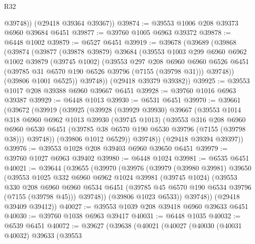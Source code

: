 \begin{lexlean}{R32}
\begin{coremodule}
          @39748))
      (@29418 @39364 @39367))
@39874 := @39553 @1006 @208 @39373 @6960 @39684 @6451
@39877 := @39760 @1005 @6963 @39372
@39878 := @6448 @1002
@39879 := @6527 @6451
@39919 := @39678
    (@39689
      (@39868
        (@39874
          (@39877
            (@39878 @39879)
            @39684
            (@39553
              @1003
              @299
              @6960
              @6962
              @1002
              @39879
              (@39745 @1002)
              (@39553
                @297
                @208
                @6960
                @6960
                @6526
                @6451
                (@39785 @31 @6570 @190 @6526 @39796 (@7155 (@39798 @31)))
                @39748))
            (@39806 @1001 @6525))
          @39748))
      (@29418 @39379 @39382))
@39925 := @39553 @1017 @208 @39388 @6960 @39667 @6451
@39928 := @39760 @1016 @6963 @39387
@39929 := @6448 @1013
@39930 := @6531 @6451
@39970 := @39661
    (@39672
      (@39919
        (@39925
          (@39928
            (@39929 @39930)
            @39667
            (@39553
              @1014
              @318
              @6960
              @6962
              @1013
              @39930
              (@39745 @1013)
              (@39553
                @316
                @208
                @6960
                @6960
                @6530
                @6451
                (@39785 @38 @6570 @190 @6530 @39796 (@7155 (@39798 @38)))
                @39748))
            (@39806 @1012 @6529))
          @39748))
      (@29418 @39394 @39397))
@39976 := @39553 @1028 @208 @39403 @6960 @39650 @6451
@39979 := @39760 @1027 @6963 @39402
@39980 := @6448 @1024
@39981 := @6535 @6451
@40021 := @39644
    (@39655
      (@39970
        (@39976
          (@39979
            (@39980 @39981)
            @39650
            (@39553
              @1025
              @332
              @6960
              @6962
              @1024
              @39981
              (@39745 @1024)
              (@39553
                @330
                @208
                @6960
                @6960
                @6534
                @6451
                (@39785 @45 @6570 @190 @6534 @39796 (@7155 (@39798 @45)))
                @39748))
            (@39806 @1023 @6533))
          @39748))
      (@29418 @39409 @39412))
@40027 := @39553 @1039 @208 @39418 @6960 @39633 @6451
@40030 := @39760 @1038 @6963 @39417
@40031 := @6448 @1035
@40032 := @6539 @6451
@40072 := @39627
    (@39638
      (@40021
        (@40027
          (@40030
            (@40031 @40032)
            @39633
            (@39553

\end{coremodule}
\end{lexlean}
